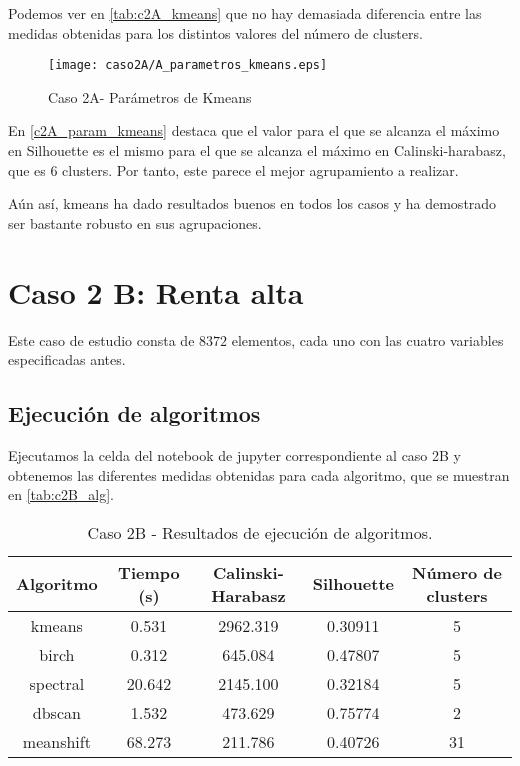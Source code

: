 Podemos ver en \eqref{tab:c2A_kmeans} que no hay demasiada diferencia entre las medidas obtenidas para los distintos valores del número de clusters.

\begin{figure}[H]
\caption{Caso 2A- Parámetros de Kmeans}
\label{c2A_param_kmeans}
\texttt{[image: caso2A/A\_parametros\_kmeans.eps]}
\end{figure}

En \eqref{c2A_param_kmeans} destaca que el valor para el que se alcanza el máximo en Silhouette es el mismo para el que se alcanza el máximo en Calinski-harabasz, que es 6 clusters. Por tanto, este parece el mejor agrupamiento a realizar.

Aún así, kmeans ha dado resultados buenos en todos los casos y ha demostrado ser bastante robusto en sus agrupaciones.



\section{Caso 2 B: Renta alta}

Este caso de estudio consta de $8372$ elementos, cada uno con las cuatro variables especificadas antes.

\subsection{Ejecución de algoritmos}

Ejecutamos la celda del notebook de jupyter correspondiente al caso 2B y obtenemos las diferentes medidas obtenidas para cada algoritmo, que se muestran en \eqref{tab:c2B_alg}.

\begin{table}[H]
\centering
\caption{Caso 2B - Resultados de ejecución de algoritmos.}
\label{tab:c2B_alg}
\begin{tabular}{ccccc}
\toprule
 Algoritmo & Tiempo (s) & Calinski-Harabasz & Silhouette & Número de clusters \\
\midrule
kmeans & 0.531 & 2962.319 & 0.30911 & 5 \\
birch & 0.312 & 645.084 & 0.47807 & 5 \\
spectral & 20.642 & 2145.100 & 0.32184 & 5 \\
dbscan & 1.532 & 473.629 & 0.75774 & 2 \\
meanshift & 68.273 & 211.786 & 0.40726 & 31 \\
\bottomrule
\end{tabular}
\end{table}

